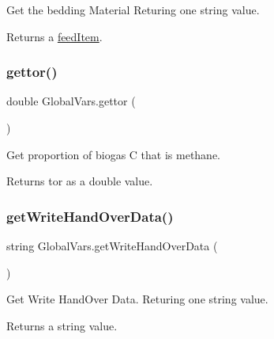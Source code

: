 Get the bedding Material Returing one string value. 

\begin{DoxyReturn}{Returns}
a \mbox{\hyperlink{classfeed_item}{feed\+Item}}. 
\end{DoxyReturn}
\mbox{\label{class_global_vars_a60e8f9c8b6c0c733505a44c6d90ee683}} 
\subsubsection{\texorpdfstring{gettor()}{gettor()}}
{\footnotesize\ttfamily double Global\+Vars.\+gettor (\begin{DoxyParamCaption}{ }\end{DoxyParamCaption})\hspace{0.3cm}{\ttfamily [inline]}}



Get proportion of biogas C that is methane. 

\begin{DoxyReturn}{Returns}
tor as a double value. 
\end{DoxyReturn}
\mbox{\label{class_global_vars_aba6cb8dacca6e4db1f77c504027e38a7}} 
\subsubsection{\texorpdfstring{getWriteHandOverData()}{getWriteHandOverData()}}
{\footnotesize\ttfamily string Global\+Vars.\+get\+Write\+Hand\+Over\+Data (\begin{DoxyParamCaption}{ }\end{DoxyParamCaption})\hspace{0.3cm}{\ttfamily [inline]}}



Get Write Hand\+Over Data. Returing one string value. 

\begin{DoxyReturn}{Returns}
a string value. 
\end{DoxyReturn}
\mbox{\label{class_global_vars_a093efdf94804ab6ddbf94a475543ea15}} 
